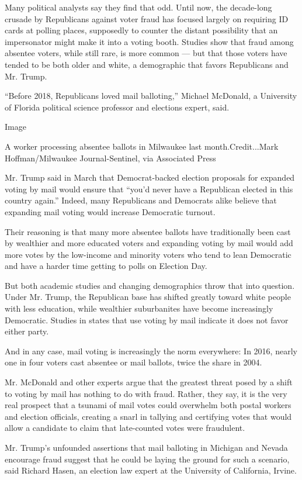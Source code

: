 Many political analysts say they find that odd. Until now, the
decade-long crusade by Republicans against voter fraud has focused
largely on requiring ID cards at polling places, supposedly to counter
the distant possibility that an impersonator might make it into a voting
booth. Studies show that fraud among absentee voters, while still rare,
is more common --- but that those voters have tended to be both older
and white, a demographic that favors Republicans and Mr. Trump.

``Before 2018, Republicans loved mail balloting,'' Michael McDonald, a
University of Florida political science professor and elections expert,
said.

Image

A worker processing absentee ballots in Milwaukee last
month.Credit...Mark Hoffman/Milwaukee Journal-Sentinel, via Associated
Press

Mr. Trump said in March that Democrat-backed election proposals for
expanded voting by mail would ensure that ``you'd never have a
Republican elected in this country again.'' Indeed, many Republicans and
Democrats alike believe that expanding mail voting would increase
Democratic turnout.

Their reasoning is that many more absentee ballots have traditionally
been cast by wealthier and more educated voters and expanding voting by
mail would add more votes by the low-income and minority voters who tend
to lean Democratic and have a harder time getting to polls on Election
Day.

But both academic studies and changing demographics throw that into
question. Under Mr. Trump, the Republican base has shifted greatly
toward white people with less education, while wealthier suburbanites
have become increasingly Democratic. Studies in states that use voting
by mail indicate it does not favor either party.

And in any case, mail voting is increasingly the norm everywhere: In
2016, nearly one in four voters cast absentee or mail ballots, twice the
share in 2004.

Mr. McDonald and other experts argue that the greatest threat posed by a
shift to voting by mail has nothing to do with fraud. Rather, they say,
it is the very real prospect that a tsunami of mail votes could
overwhelm both postal workers and election officials, creating a snarl
in tallying and certifying votes that would allow a candidate to claim
that late-counted votes were fraudulent.

Mr. Trump's unfounded assertions that mail balloting in Michigan and
Nevada encourage fraud suggest that he could be laying the ground for
such a scenario, said Richard Hasen, an election law expert at the
University of California, Irvine.

